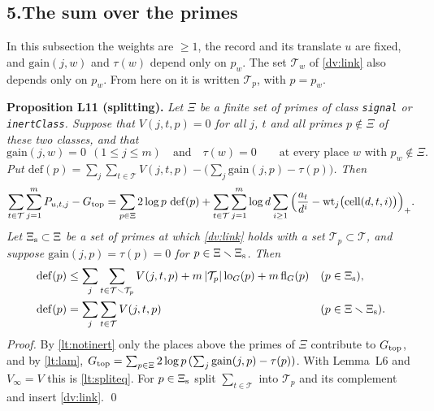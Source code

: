 \documentclass[11pt,letterpaper]{article}
\begin{document}
\subsection*{5.\quad The sum over the primes}

In this subsection the weights are $\ge1$, the record and its translate $u$ are fixed, and
$\mathrm{gain}(j,w)$ and $\tau(w)$ depend only on $p_w$. The set $\mathcal T_w$ of \eqref{dv:link} also
depends only on $p_w$. From here on it is written $\mathcal T_p$, with $p=p_w$.

\textbf{Proposition L11 (splitting).} \emph{Let $\Xi$ be a finite set of primes of class \texttt{signal}
or \texttt{inertClass}. Suppose that $V(j,t,p)=0$ for all $j$, $t$ and all primes $p\notin\Xi$ of these two
classes, and that}
\begin{equation}\label{lt:notinert}
 \mathrm{gain}(j,w)=0\ \ (1\le j\le m)\quad\text{and}\quad\tau(w)=0\qquad
 \text{at every place $w$ with }p_w\notin\Xi .
\end{equation}
\emph{Put $\mathrm{def}(p)=\sum_{j}\sum_{t\in\mathcal T}V(j,t,p)-\big(\sum_j\mathrm{gain}(j,p)-\tau(p)\big)$.
Then}
\begin{equation}\label{lt:spliteq}
 \sum_{t\in\mathcal T}\sum_{j=1}^mP_{u,t,j}-G_{\rm top}=\sum_{p\in\Xi}2\log p\ \mathrm{def}(p)
 +\sum_{t\in\mathcal T}\sum_{j=1}^m\log d\sum_{i\ge1}
   \Big(\frac{a_t}{d^i}-\mathrm{wt}_j\big(\mathrm{cell}(d,t,i)\big)\Big)_+ .
\end{equation}
\emph{Let $\Xi_{\rm s}\subset\Xi$ be a set of primes at which \eqref{dv:link} holds with a set
$\mathcal T_p\subset\mathcal T$, and suppose $\mathrm{gain}(j,p)=\tau(p)=0$ for
$p\in\Xi\smallsetminus\Xi_{\rm s}$. Then}
\begin{equation}\label{lt:split}
\begin{aligned}
 \mathrm{def}(p)&\le\sum_j\sum_{t\in\mathcal T\smallsetminus\mathcal T_p}V(j,t,p)+m\,|\mathcal T_p|\,\mathrm{lo}_G(p)+m\,\mathrm{fl}_G(p)
 &&(p\in\Xi_{\rm s}),\\
 \mathrm{def}(p)&=\sum_j\sum_{t\in\mathcal T}V(j,t,p)&&(p\in\Xi\smallsetminus\Xi_{\rm s}).
\end{aligned}
\end{equation}
\emph{Proof.} By \eqref{lt:notinert} only the places above the primes of $\Xi$ contribute to
$G_{\rm top}$, and by \eqref{lt:lam}, $G_{\rm top}=\sum_{p\in\Xi}2\log p\,(\sum_j\mathrm{gain}(j,p)-\tau(p))$.
With Lemma~L6 and $V_\infty=V$ this is \eqref{lt:spliteq}. For $p\in\Xi_{\rm s}$ split
$\sum_{t\in\mathcal T}$ into $\mathcal T_p$ and its complement and insert \eqref{dv:link}. \qed
\end{document}
